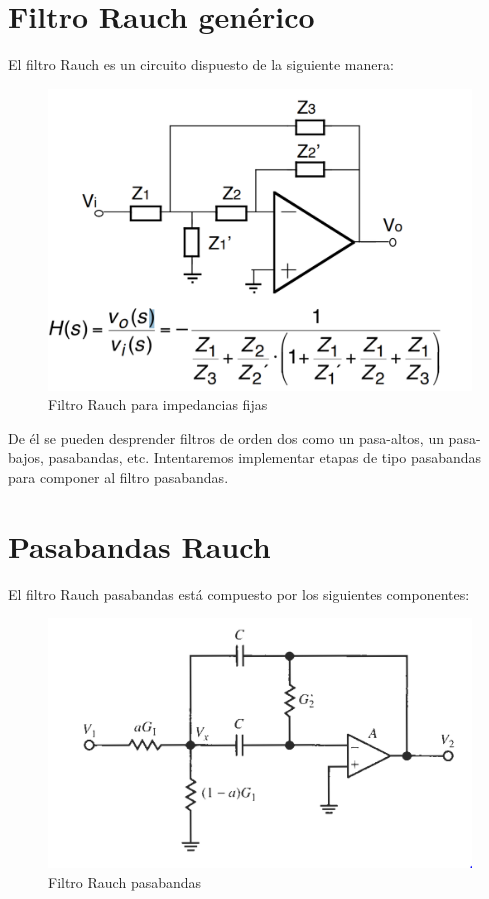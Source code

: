 \documentclass[../../tc_tp5_main.tex]{subfiles}
\begin{document}
 \section{Filtro Rauch genérico}
 
 El filtro Rauch es un circuito dispuesto de la siguiente manera:\par
 
\begin{figure}[H]	%
	\centering
	\includegraphics[scale=0.5]{imagenes/rauch_generico.png}
	\caption{Filtro Rauch para impedancias fijas}
	\label{fig:ej2_rauch_generico}
\end{figure}

 De él se pueden desprender filtros de orden dos como un pasa-altos, un pasa-bajos, pasabandas, etc. Intentaremos implementar etapas de tipo pasabandas para componer al filtro pasabandas.
  
 \section{Pasabandas Rauch}
 
 El filtro Rauch pasabandas está compuesto por los siguientes componentes:
 
 \begin{figure}[H]	%
	\centering
	\includegraphics[scale=0.5]{imagenes/rauch_passband.png}
	\caption{Filtro Rauch pasabandas}
	\label{fig:ej2_rauch_passband}
	\end{figure}
	
\end{document}
